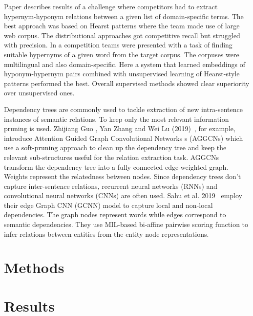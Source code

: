 \documentclass[fleqn,moreauthors,10pt]{ds_report}
\begin{document}
Paper \cite{bordea-etal-2016-semeval} describes results of a challenge where competitors had to extract hypernym-hyponym relations between a given list of domain-specific terms. The best approach was based on Hearst patterns where the team made use of large web corpus. The distributional approaches got competitive recall but struggled with precision. In a competition \cite{camacho-collados-etal-2018-semeval} teams were presented with a task of finding suitable hypernyms of a given word from the target corpus. The corpuses were multilingual and also domain-specific. Here a system that learned embeddings of hyponym-hypernym pairs combined with unsupervised learning of Hearst-style patterns performed the best. Overall supervised methods showed clear superiority over unsupervised ones.

Dependency trees are commonly used to tackle extraction of new intra-sentence instances of semantic relations. To keep only the most relevant information pruning is used. Zhijiang Guo , Yan Zhang and Wei Lu (2019)~\cite{zhijiang_nodate}, for example, introduce Attention Guided Graph Convolutional Networks s (AGGCNs) which use a soft-pruning approach to clean up the dependency tree and keep the relevant sub-structures useful for the relation extraction task. AGGCNs transform the dependency tree into a fully connected edge-weighted graph. Weights represent the relatedness between nodes. 
Since dependency trees don’t capture inter-sentence relations, recurrent neural networks (RNNs) and convolutional neural networks (CNNs) are often used. Sahu et al. 2019~\cite{sunil_kumar_nodate} employ their edge Graph CNN (GCNN) model to capture local and non-local dependencies. The graph nodes represent words while edges correspond to semantic dependencies. They use MIL-based bi-affine pairwise scoring function to infer relations between entities from the entity node representations. 


\section*{Methods}



\section*{Results}
\end{document}
